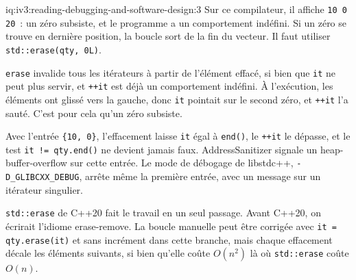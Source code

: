 \begin{solution}{iq:iv3:reading-debugging-and-software-design:3}
Sur ce compilateur, il affiche \texttt{10 0 20}~: un zéro subsiste, et le programme a un comportement indéfini. Si un zéro se trouve en dernière position, la boucle sort de la fin du vecteur. Il faut utiliser \texttt{std::erase(qty, 0L)}.

\texttt{erase} invalide tous les itérateurs à partir de l'élément effacé, si bien que \texttt{it} ne peut plus servir, et \texttt{++it} est déjà un comportement indéfini. À l'exécution, les éléments ont glissé vers la gauche, donc \texttt{it} pointait sur le second zéro, et \texttt{++it} l'a sauté. C'est pour cela qu'un zéro subsiste.

Avec l'entrée \texttt{\{10, 0\}}, l'effacement laisse \texttt{it} égal à \texttt{end()}, le \texttt{++it} le dépasse, et le test \texttt{it != qty.end()} ne devient jamais faux. AddressSanitizer signale un heap-buffer-overflow sur cette entrée. Le mode de débogage de libstdc++, \texttt{-D\_GLIBCXX\_DEBUG}, arrête même la première entrée, avec un message sur un itérateur singulier.

\texttt{std::erase} de C++20 fait le travail en un seul passage. Avant C++20, on écrirait l'idiome erase-remove. La boucle manuelle peut être corrigée avec \texttt{it = qty.erase(it)} et sans incrément dans cette branche, mais chaque effacement décale les éléments suivants, si bien qu'elle coûte $O(n^2)$ là où \texttt{std::erase} coûte $O(n)$.


\end{solution}

